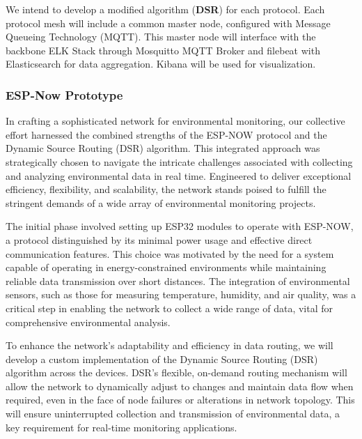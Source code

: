 We intend to develop a modified algorithm (\textbf{DSR}) for each protocol. Each protocol mesh will include a common master node, configured with Message Queueing Technology (MQTT). This master node will interface with the backbone ELK Stack through Mosquitto MQTT Broker and filebeat with Elasticsearch for data aggregation. Kibana will be used for visualization.



\subsubsection{ESP-Now Prototype}


In crafting a sophisticated network for environmental monitoring, our collective effort harnessed the combined strengths of the ESP-NOW protocol and the Dynamic Source Routing (DSR) algorithm. This integrated approach was strategically chosen to navigate the intricate challenges associated with collecting and analyzing environmental data in real time. Engineered to deliver exceptional efficiency, flexibility, and scalability, the network stands poised to fulfill the stringent demands of a wide array of environmental monitoring projects.

The initial phase involved setting up ESP32 modules to operate with ESP-NOW, a protocol distinguished by its minimal power usage and effective direct communication features. This choice was motivated by the need for a system capable of operating in energy-constrained environments while maintaining reliable data transmission over short distances. The integration of environmental sensors, such as those for measuring temperature, humidity, and air quality, was a critical step in enabling the network to collect a wide range of data, vital for comprehensive environmental analysis.

To enhance the network's adaptability and efficiency in data routing, we will develop a custom implementation of the Dynamic Source Routing (DSR) algorithm across the devices. DSR's flexible, on-demand routing mechanism will allow the network to dynamically adjust to changes and maintain data flow when required, even in the face of node failures or alterations in network topology. This will ensure uninterrupted collection and transmission of environmental data, a key requirement for real-time monitoring applications.


